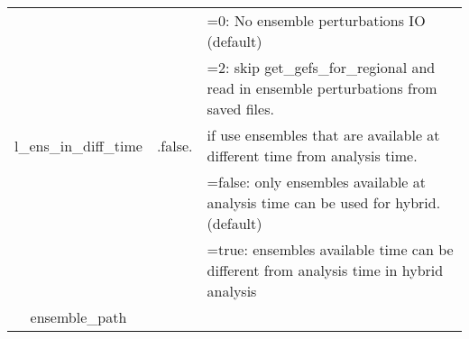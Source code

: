 \begin{table}[h]
\begin{tabular}{| c | c | p{9cm} |}
      & &  =0:  No ensemble perturbations IO (default) \\
      & &  =2:  skip get\_gefs\_for\_regional and read in ensemble perturbations from saved files. \\
   \hline
 l\_ens\_in\_diff\_time & .false. & if use ensembles that are available at different time from analysis time. \\
      & & =false: only ensembles available at analysis time can be used for hybrid. (default) \\
      & & =true: ensembles available time can be different
 from analysis time in hybrid analysis \\
 \hline
 ensemble\_path & & \\
 \hline
 \end{tabular}
\end{table}

